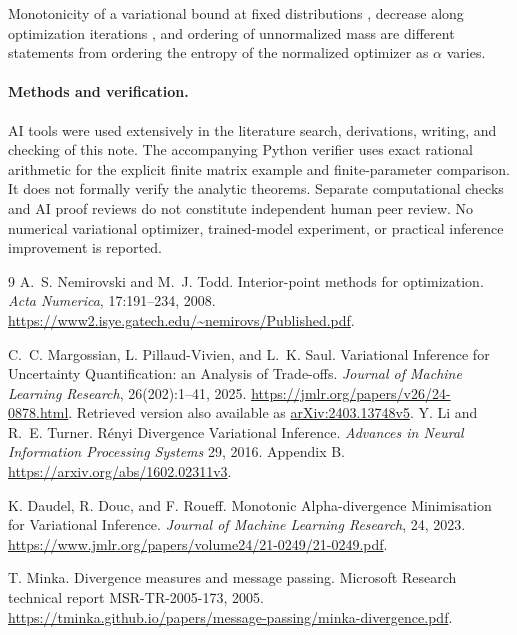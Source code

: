 \documentclass[11pt]{article}
\theoremstyle{remark}\newtheorem{remark}[theorem]{Remark}
\begin{document}
Monotonicity of a variational bound at fixed distributions
\cite{li-turner}, decrease along optimization iterations \cite{daudel},
and ordering of unnormalized mass \cite{minka} are different statements
from ordering the entropy of the normalized optimizer as $\alpha$ varies.

\paragraph{Methods and verification.}
AI tools were used extensively in the literature search, derivations,
writing, and checking of this note. The accompanying Python verifier
uses exact rational arithmetic for the explicit finite matrix example
and finite-parameter comparison. It does not formally verify the
analytic theorems. Separate computational checks and AI proof reviews
do not constitute independent human peer review. No numerical
variational optimizer, trained-model experiment, or practical
inference improvement is reported.

\begin{thebibliography}{9}
A.~S. Nemirovski and M.~J. Todd.
\newblock Interior-point methods for optimization.
\newblock \emph{Acta Numerica}, 17:191--234, 2008.
\newblock \url{https://www2.isye.gatech.edu/~nemirovs/Published.pdf}.

C.~C. Margossian, L. Pillaud-Vivien, and L.~K. Saul.
\newblock Variational Inference for Uncertainty Quantification:
an Analysis of Trade-offs.
\newblock \emph{Journal of Machine Learning Research},
26(202):1--41, 2025.
\newblock \url{https://jmlr.org/papers/v26/24-0878.html}.
\newblock Retrieved version also available as
\href{https://arxiv.org/abs/2403.13748v5}{arXiv:2403.13748v5}.
Y. Li and R.~E. Turner.
\newblock R\'enyi Divergence Variational Inference.
\newblock \emph{Advances in Neural Information Processing Systems} 29,
2016. Appendix B.
\newblock \url{https://arxiv.org/abs/1602.02311v3}.

K. Daudel, R. Douc, and F. Roueff.
\newblock Monotonic Alpha-divergence Minimisation for Variational Inference.
\newblock \emph{Journal of Machine Learning Research}, 24, 2023.
\newblock \url{https://www.jmlr.org/papers/volume24/21-0249/21-0249.pdf}.

T. Minka.
\newblock Divergence measures and message passing.
\newblock Microsoft Research technical report MSR-TR-2005-173, 2005.
\newblock \url{https://tminka.github.io/papers/message-passing/minka-divergence.pdf}.
\end{thebibliography}
\end{document}
